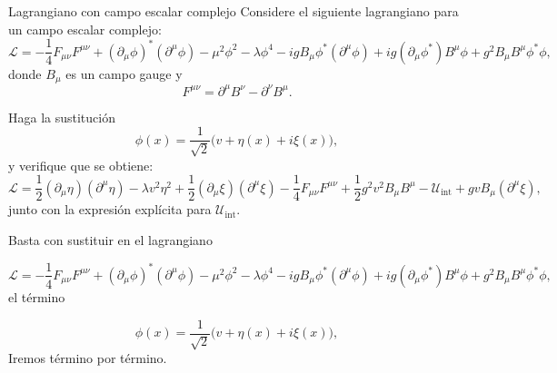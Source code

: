 \begin{Ejercicio}{Lagrangiano con campo escalar complejo}\label{Ej:19}
Considere el siguiente lagrangiano para un campo escalar complejo:
\[
\mathcal{L} = -\frac{1}{4}F_{\mu\nu}F^{\mu\nu}
+ (\partial_\mu \phi)^\ast (\partial^\mu \phi)
- \mu^2 \phi^2 - \lambda \phi^4
- i g B_\mu \phi^\ast (\partial^\mu \phi)
+ i g (\partial_\mu \phi^\ast) B^\mu \phi
+ g^2 B_\mu B^\mu \phi^\ast \phi,
\]
donde $B_\mu$ es un campo gauge y 
\[
F^{\mu\nu} = \partial^\mu B^\nu - \partial^\nu B^\mu.
\]

\medskip
Haga la sustitución 
\[
\phi(x) = \frac{1}{\sqrt{2}}\big(v + \eta(x) + i\xi(x)\big),
\]
y verifique que se obtiene:
\[
\mathcal{L} =
\frac{1}{2}(\partial_\mu \eta)(\partial^\mu \eta)
- \lambda v^2 \eta^2
+ \frac{1}{2}(\partial_\mu \xi)(\partial^\mu \xi)
- \frac{1}{4}F_{\mu\nu}F^{\mu\nu}
+ \frac{1}{2}g^2 v^2 B_\mu B^\mu
- \mathcal{U}_{\text{int}}
+ g v B_\mu (\partial^\mu \xi),
\]
junto con la expresión explícita para $\mathcal{U}_{\text{int}}$.
\end{Ejercicio}

Basta con sustituir en el lagrangiano 

\[
\mathcal{L} = -\frac{1}{4}F_{\mu\nu}F^{\mu\nu}
+ (\partial_\mu \phi)^\ast (\partial^\mu \phi)
- \mu^2 \phi^2 - \lambda \phi^4
- i g B_\mu \phi^\ast (\partial^\mu \phi)
+ i g (\partial_\mu \phi^\ast) B^\mu \phi
+ g^2 B_\mu B^\mu \phi^\ast \phi,
\]
el término 

\[
\phi(x) = \frac{1}{\sqrt{2}}\big(v + \eta(x) + i\xi(x)\big),
\]
Iremos término por término. 

